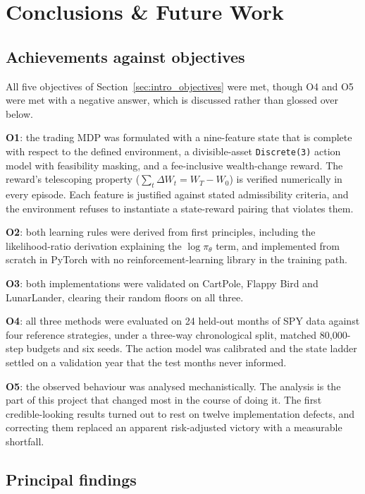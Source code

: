 \chapter{Conclusions \& Future Work}
\label{ch:conclusions}

\section{Achievements against objectives}
\label{sec:conc_objectives}

All five objectives of Section~\ref{sec:intro_objectives} were met, though
O4 and O5 were met with a negative answer, which is discussed rather than
glossed over below.

\textbf{O1}: the trading MDP was formulated with a nine-feature state that
is complete with respect to the defined environment, a divisible-asset
\texttt{Discrete(3)} action model with feasibility masking, and a
fee-inclusive wealth-change reward. The reward's telescoping property
($\sum_t \Delta W_t = W_T - W_0$) is verified numerically in every episode.
Each feature is justified against stated admissibility criteria, and the
environment refuses to instantiate a state-reward pairing that violates
them.

\textbf{O2}: both learning rules were derived from first principles,
including the likelihood-ratio derivation explaining the $\log\pi_\theta$
term, and implemented from scratch in PyTorch with no reinforcement-learning
library in the training path.

\textbf{O3}: both implementations were validated on CartPole, Flappy Bird
and LunarLander, clearing their random floors on all three.

\textbf{O4}: all three methods were evaluated on 24 held-out months of SPY
data against four reference strategies, under a three-way chronological
split, matched 80{,}000-step budgets and six seeds. The action model was
calibrated and the state ladder settled on a validation year that the test
months never informed.

\textbf{O5}: the observed behaviour was analysed mechanistically. The
analysis is the part of this project that changed most in the course of
doing it. The first credible-looking results turned out to rest on
twelve implementation defects, and correcting them replaced an apparent
risk-adjusted victory with a measurable shortfall.

\section{Principal findings}
\label{sec:conc_findings}

